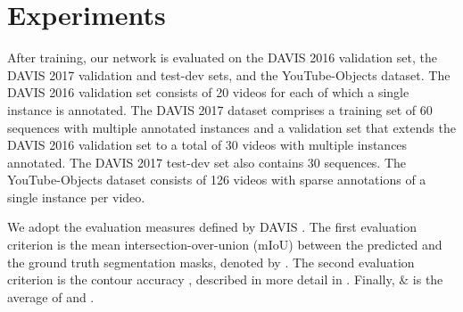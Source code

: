 \documentclass[10pt,twocolumn,letterpaper]{article}
\begin{document}
\section{Experiments}
After training, our network is evaluated on the DAVIS 2016 \cite{DAVIS2016} validation set, the DAVIS 2017 \cite{DAVIS2017} validation and test-dev sets, and the YouTube-Objects \cite{YoutubeObjectsOriginal,YoutubeObjectsSegmentation} dataset.
The DAVIS 2016 validation set consists of 20 videos for each of which a single instance is annotated.
The DAVIS 2017 dataset comprises a training set of 60 sequences with multiple annotated instances and a validation set that extends the DAVIS 2016 validation set to a total of 30 videos with multiple instances annotated. The DAVIS 2017 test-dev set also contains 30 sequences. The YouTube-Objects dataset \cite{YoutubeObjectsOriginal,YoutubeObjectsSegmentation} consists of 126 videos with sparse annotations of a single instance per video. 

We adopt the evaluation measures defined by DAVIS \cite{DAVIS2016}. The first evaluation criterion is the mean intersection-over-union (mIoU) between the predicted and the ground truth segmentation masks, denoted by . The second evaluation criterion is the contour accuracy , described in more detail in \cite{DAVIS2016}. Finally, \& is the average of  and .
\end{document}
